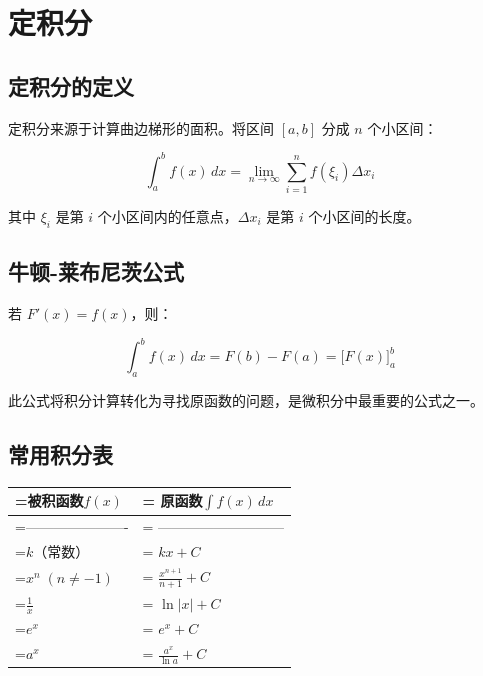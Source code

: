 \documentclass{harryopo-mathnotes}
\begin{document}
\section{定积分}

\subsection{定积分的定义}

定积分来源于计算曲边梯形的面积。将区间 $[a, b]$ 分成 $n$ 个小区间：

$$
\int_a^b f(x)\,dx = \lim_{n \to \infty} \sum_{i=1}^{n} f(\xi_i) \Delta x_i
$$

其中 $\xi_i$ 是第 $i$ 个小区间内的任意点，$\Delta x_i$ 是第 $i$ 个小区间的长度。

\subsection{牛顿-莱布尼茨公式}

若 $F'(x) = f(x)$，则：

$$
\int_a^b f(x)\,dx = F(b) - F(a) = \big[F(x)\big]_a^b
$$

此公式将积分计算转化为寻找原函数的问题，是微积分中最重要的公式之一。

\subsection{常用积分表}

\begin{table}[htbp]
\centering
\begin{tabularx}{\textwidth}{>{\hsize=0.898\hsize\linewidth=\hsize}X>{\hsize=1.102\hsize\linewidth=\hsize}X}
\toprule
\textbf{被积函数$f(x)$} & \textbf{原函数$\int f(x)\,dx$} \\
\midrule
---------------------- & --------------------------- \\
$k$（常数） & $kx + C$ \\
$x^n \; (n \neq -1)$ & $\frac{x^{n+1}}{n+1} + C$ \\
$\frac{1}{x}$ & $\ln|x| + C$ \\
$e^x$ & $e^x + C$ \\
$a^x$ & $\frac{a^x}{\ln a} + C$ \\
\bottomrule
\end{tabularx}
\end{table}
\end{document}
